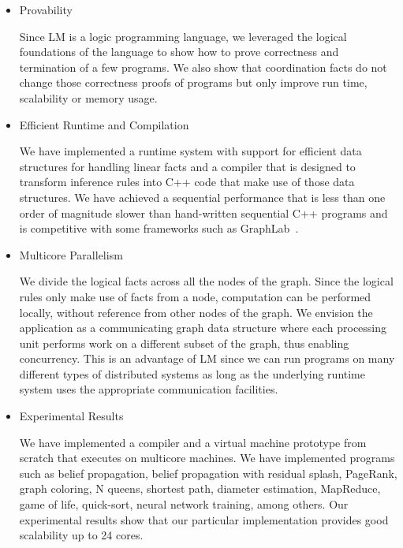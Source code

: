 \begin{itemize}
   \item Provability
   
   Since LM is a logic programming language, we leveraged the logical
   foundations of the language to show how to prove correctness and termination of a few
   programs. We also show that coordination facts do not change those
   correctness proofs of programs but only improve run time, scalability or
   memory usage.


   \item Efficient Runtime and Compilation

   We have implemented a runtime system with support for efficient data
   structures for handling linear facts and a compiler that is designed to
   transform inference rules into C++ code that make use of those data
   structures. We have achieved a sequential performance that is less than one
   order of magnitude slower than hand-written sequential C++ programs and is
   competitive with some frameworks such as GraphLab~\cite{GraphLab2010}.

   \item Multicore Parallelism
   
   We divide the logical facts across all the nodes of the graph. Since the
   logical rules only make use of facts from a node, computation can be
   performed locally, without reference from other nodes of the graph.
   We envision the application as a communicating graph data structure where
   each processing unit performs work on a different subset of the graph, thus
   enabling concurrency. This is an advantage of LM since we can run programs on
   many different types of distributed systems as long as the underlying runtime
   system uses the appropriate communication facilities.

   \item Experimental Results

   We have implemented a compiler and a virtual machine prototype from
   scratch that executes on multicore machines.  We have implemented programs
   such as belief propagation, belief propagation with residual splash,
   PageRank, graph coloring, N queens, shortest path, diameter estimation,
   MapReduce, game of life, quick-sort, neural network training, among others.
   Our experimental results show that our particular implementation provides
   good scalability up to 24 cores.
   
\end{itemize}
